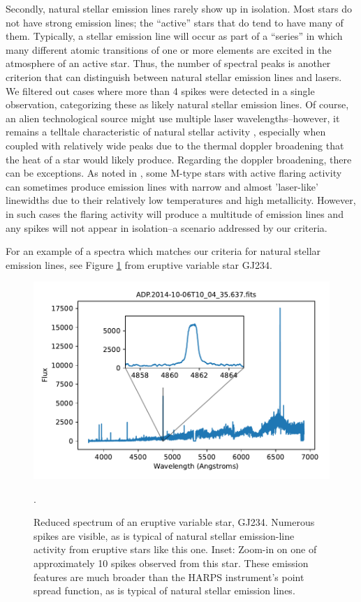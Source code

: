 \documentclass[twocolumn]{aastex701}
\begin{document}
Secondly, natural stellar emission lines rarely show up in isolation. Most stars do not have strong emission lines; the ``active'' stars that do tend to have many of them. Typically, a stellar emission line will occur as part of a “series” in which many different atomic transitions of one or more elements are excited in the atmosphere of an active star.  Thus, the number of spectral peaks is another criterion that can distinguish between natural stellar emission lines and lasers. We filtered out cases where more than 4 spikes were detected in a single observation, categorizing these as likely natural stellar emission lines.  Of course, an alien technological source might use multiple laser wavelengths--however, it remains a telltale characteristic of natural stellar activity \citep{Livadiotis_2018}, especially when coupled with relatively wide peaks due to the thermal doppler broadening that the heat of a star would likely produce. Regarding the doppler broadening, there can be exceptions. As noted in \citep{ProximaCentauri}, some M-type stars with active flaring activity can sometimes produce emission lines  with  narrow and almost 'laser-like' linewidths due to their relatively low temperatures and high metallicity. However, in such cases the flaring activity will produce a multitude of emission lines and any spikes will not appear in isolation--a scenario addressed by our  criteria.

For an example of a spectra which matches our criteria for natural stellar emission lines, see Figure \ref{fig:eruptivevariablestar}  from eruptive variable star GJ234.

\begin{figure}
    \centering
    \includegraphics[width=\columnwidth]{clean-figures/eruptivevariablestar.pdf}
    \caption{Reduced spectrum of an eruptive variable star, GJ234. Numerous spikes are visible, as is typical of natural stellar emission-line activity from eruptive stars like this one.  Inset: Zoom-in on one of approximately 10 spikes observed from 
    this star. These emission features are much broader than the HARPS instrument's point spread function, as is typical of natural stellar emission lines.}.
    \label{fig:eruptivevariablestar}
\end{figure}
\end{document}
